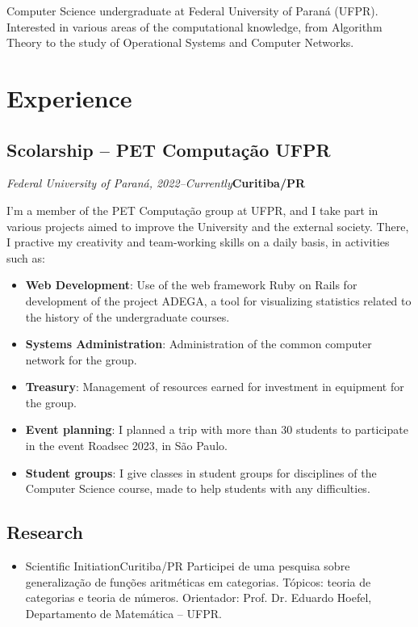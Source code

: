 \documentclass[a4paper, 12pt]{moderncv}
\begin{document}
\makecvtitle

\small{Computer Science undergraduate at Federal University of Paraná (UFPR).
Interested in various areas of the computational knowledge, from Algorithm
Theory to the study of Operational Systems and Computer Networks.}

\section{Experience}
\vspace{1pt}
\subsection{\small{Scolarship -- PET Computação UFPR}}
\textit{Federal University of Paraná, 2022--Currently}\hspace{190pt}\textbf{Curitiba/PR}

\vspace{3pt}
I'm a member of the PET Computação group at UFPR, and I take part in various
projects aimed to improve the University and the external society. There, I
practive my creativity and team-working skills on a daily basis, in activities
such as:
\vspace{4pt}
\begin{itemize}
    \item{\textbf{Web Development}: Use of the web framework Ruby on Rails for
          development of the project ADEGA, a tool for visualizing statistics
          related to the history of the undergraduate courses.}
    \item{\textbf{Systems Administration}: Administration of the common computer
          network for the group.}
    \item{\textbf{Treasury}: Management of resources earned for investment in
          equipment for the group.}
    \item{\textbf{Event planning}: I planned a trip with more than 30 students
          to participate in the event Roadsec 2023, in São Paulo.}
    \item{\textbf{Student groups}: I give classes in student groups for
          disciplines of the Computer Science course, made to help students with
          any difficulties.}
\end{itemize}

\vspace{4pt}
\subsection{\small{Research}}
\begin{itemize}
    \item{
        {Scientific Initiation}{Curitiba/PR}{}
        {Participei de uma pesquisa sobre generalização de funções aritméticas em
         categorias. Tópicos: teoria de categorias e teoria de números. Orientador:
         Prof. Dr. Eduardo Hoefel, Departamento de Matemática -- UFPR.}}
\end{itemize}
\end{document}
